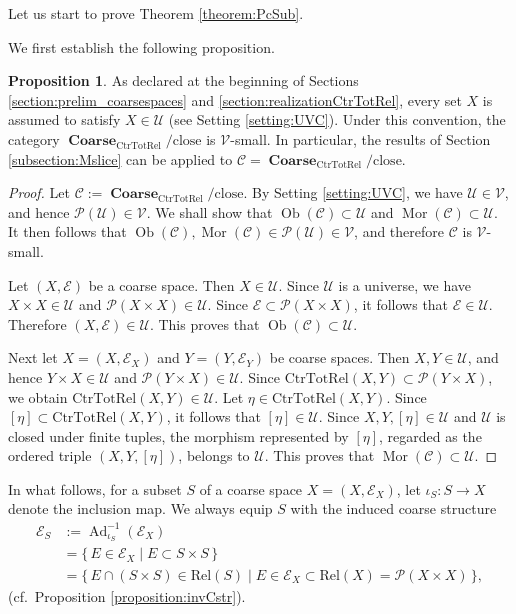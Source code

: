 \documentclass[12pt, a4paper]{amsart}
\theoremstyle{definition}
\newtheorem{proposition}[theorem]{Proposition}
\newcommand{\Ad}{\mathop{\mathrm{Ad}}\nolimits}
\newcommand{\Mor}{\mathop{\mathrm{Mor}}\nolimits}
\newcommand{\Ob}{\mathop{\mathrm{Ob}}\nolimits}
\newcommand{\Coarse}{\mathop{\mathbf{Coarse}}\nolimits}
\newcommand{\Rel}{\mathrm{Rel}}
\newcommand{\CtrTotRel}{\mathrm{CtrTotRel}}
\newcommand{\close}{\mathrm{close}}
\begin{document}
Let us start to prove Theorem \ref{theorem:PcSub}.

We first establish the following proposition.

\begin{proposition}\label{proposition:CoarseVsmall}
As declared at the beginning of Sections \ref{section:prelim_coarsespaces} and
\ref{section:realizationCtrTotRel}, 
every set $X$ is assumed to satisfy $X\in\mathcal{U}$ (see Setting \ref{setting:UVC}). 
Under this convention,
the category $\Coarse_{\CtrTotRel}/{\close}$ is $\mathcal{V}$-small.
In particular, the results of Section \ref{subsection:Mslice} can be applied to
$\mathcal{C}=\Coarse_{\CtrTotRel}/{\close}$.
\end{proposition}

\begin{proof}
Let $\mathcal{C}:=\Coarse_{\CtrTotRel}/{\close}$.
By Setting \ref{setting:UVC}, we have $\mathcal{U}\in\mathcal{V}$, and hence
$\mathcal{P}(\mathcal{U})\in\mathcal{V}$.
We shall show that $\Ob(\mathcal{C})\subset\mathcal{U}$ and
$\Mor(\mathcal{C})\subset\mathcal{U}$.
It then follows that
$\Ob(\mathcal{C}),\Mor(\mathcal{C})\in\mathcal{P}(\mathcal{U})\in\mathcal{V}$,
and therefore $\mathcal{C}$ is $\mathcal{V}$-small.

Let $(X,\mathcal{E})$ be a coarse space.
Then $X\in\mathcal{U}$.
Since $\mathcal{U}$ is a universe, we have
$X\times X\in\mathcal{U}$ and
$\mathcal{P}(X\times X)\in\mathcal{U}$.
Since $\mathcal{E}\subset\mathcal{P}(X\times X)$, it follows that
$\mathcal{E}\in\mathcal{U}$.
Therefore $(X,\mathcal{E})\in\mathcal{U}$.
This proves that $\Ob(\mathcal{C})\subset\mathcal{U}$.

Next let
$X=(X,\mathcal{E}_X)$ and
$Y=(Y,\mathcal{E}_Y)$
be coarse spaces.
Then $X,Y\in\mathcal{U}$, and hence
$Y\times X\in\mathcal{U}$ and
$\mathcal{P}(Y\times X)\in\mathcal{U}$.
Since
$\CtrTotRel(X,Y)\subset\mathcal{P}(Y\times X)$,
we obtain
$\CtrTotRel(X,Y)\in\mathcal{U}$.
Let $\eta\in\CtrTotRel(X,Y)$.
Since $[\eta]\subset\CtrTotRel(X,Y)$, it follows that
$[\eta]\in\mathcal{U}$.
Since $X,Y,[\eta]\in\mathcal{U}$ and $\mathcal{U}$ is closed under finite tuples,
the morphism represented by $[\eta]$, regarded as the ordered triple
$(X,Y,[\eta])$, belongs to $\mathcal{U}$.
This proves that $\Mor(\mathcal{C})\subset\mathcal{U}$.
\end{proof}


In what follows, for a subset $S$ of a coarse space
$X=(X,\mathcal{E}_X)$,
let
$\iota_S:S\rightarrow X$
denote the inclusion map.
We always equip $S$ with the induced coarse structure
\begin{align*}
\mathcal{E}_S
    &:=
\Ad_{\iota_S}^{-1}(\mathcal{E}_X) \\
    &=
\{\,E\in\mathcal{E}_X \mid E\subset S\times S\,\} \\
    &=
\{\,E\cap(S\times S)\in\Rel(S)
\mid
E\in\mathcal{E}_X\subset\Rel(X)
=
\mathcal{P}(X\times X)\,\},
\end{align*}
(cf.~Proposition \ref{proposition:invCstr}).
\end{document}
